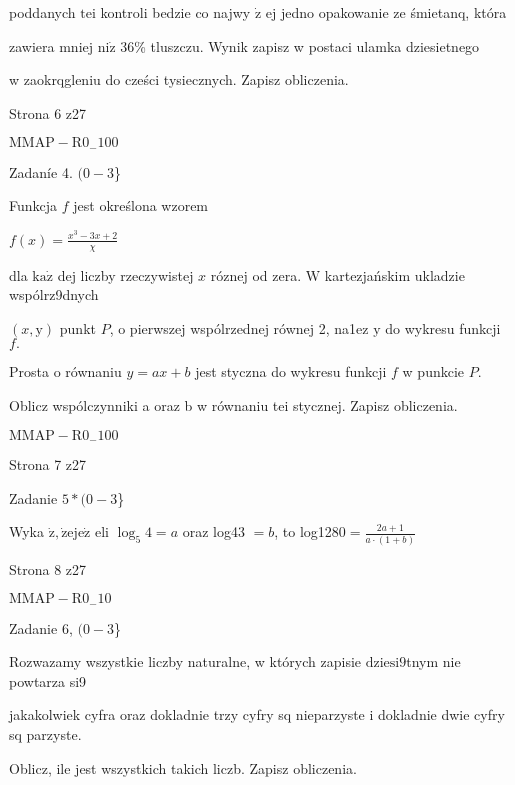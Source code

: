 \documentclass[a4paper,12pt]{article}
\begin{document}
poddanych $\mathrm{t}\mathrm{e}\mathrm{i}$ kontroli bedzie co najwy $\dot{\mathrm{z}}$ ej jedno opakowanie ze śmietanq, która

zawiera mniej $\mathrm{n}\mathrm{i}\dot{\mathrm{z}}$ 36\% tluszczu. Wynik zapisz w postaci ulamka dziesietnego

w zaokrqgleniu do cześci tysiecznych. Zapisz obliczenia.

Strona 6 z27

$\mathrm{M}\mathrm{M}\mathrm{A}\mathrm{P}-\mathrm{R}0_{-}100$





Zadaníe 4. $(0-3$\}

Funkcja $f$ jest określona wzorem

$f(x)=\displaystyle \frac{x^{3}-3x+2}{\chi}$

dla $\mathrm{k}\mathrm{a}\dot{\mathrm{z}}$ dej liczby rzeczywistej $x$ róznej od zera. $\mathrm{W}$ kartezjańskim ukladzie wspólrz9dnych

$(x,\mathrm{y})$ punkt $P$, o pierwszej wspólrzednej równej 2, na1ez $\mathrm{y}$ do wykresu funkcji $f.$

Prosta o równaniu $y=ax+b$ jest styczna do wykresu funkcji $f$ w punkcie $P.$

Oblicz wspólczynniki a oraz b w równaniu tei stycznej. Zapisz obliczenia.

$\mathrm{M}\mathrm{M}\mathrm{A}\mathrm{P}-\mathrm{R}0_{-}100$

Strona 7 z27





Zadanie $5*(0-3$\}

Wyka $\dot{\mathrm{z}}, \dot{\mathrm{z}}\mathrm{e}\mathrm{j}\mathrm{e}\dot{\mathrm{z}}$ eli $\log_{5}4=a$ oraz log43 $=b$, to log1280$=\displaystyle \frac{2a+1}{a\cdot(1+b)}$

Strona 8 z27

$\mathrm{M}\mathrm{M}\mathrm{A}\mathrm{P}-\mathrm{R}0_{-}10$





Zadanie 6, $(0-3$\}

Rozwazamy wszystkie liczby naturalne, w których zapisie $\mathrm{d}\mathrm{z}\mathrm{i}\mathrm{e}\mathrm{s}\mathrm{i}9$tnym nie powtarza si9

jakakolwiek cyfra oraz dokladnie trzy cyfry sq nieparzyste i dokladnie dwie cyfry sq parzyste.

Oblicz, ile jest wszystkich takich liczb. Zapisz obliczenia.
\end{document}
